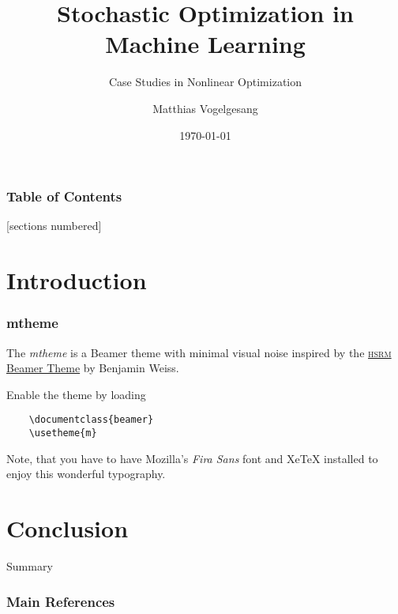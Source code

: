 \documentclass[10pt]{beamer}
\title{Stochastic Optimization in Machine Learning}
\subtitle{Case Studies in Nonlinear Optimization}
\date{\today}
\author{Matthias Vogelgesang}
\institute{Technische Universität München}
\begin{document}
\maketitle

\begin{frame}
  \frametitle{Table of Contents}
  [sections numbered]
  \tableofcontents[hideallsubsections]
\end{frame}

\section{Introduction}

\begin{frame}[fragile]
  \frametitle{mtheme}

  The \emph{mtheme} is a Beamer theme with minimal visual noise inspired by the
  \href{https://github.com/hsrmbeamertheme/hsrmbeamertheme}{\textsc{hsrm} Beamer
  Theme} by Benjamin Weiss.

  Enable the theme by loading

  \begin{verbatim}    \documentclass{beamer}
    \usetheme{m}\end{verbatim}

  Note, that you have to have Mozilla's \emph{Fira Sans} font and XeTeX
  installed to enjoy this wonderful typography.
\end{frame}

\section{Conclusion}

\begin{frame}{Summary}

 

  \begin{center}\ccbysa\end{center}

\end{frame}


\begin{frame}[allowframebreaks]

  \frametitle{Main References}

  
  

\end{frame}
\end{document}
